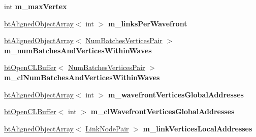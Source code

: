 \begin{DoxyCompactItemize}
int {\bfseries m\+\_\+max\+Vertex}
\item 
\mbox{\label{classbtSoftBodyLinkDataOpenCLSIMDAware_a585750270f2d52986a70bc9e9fce69bc}} 
\hyperlink{classbtAlignedObjectArray}{bt\+Aligned\+Object\+Array}$<$ int $>$ {\bfseries m\+\_\+links\+Per\+Wavefront}
\item 
\mbox{\label{classbtSoftBodyLinkDataOpenCLSIMDAware_a22df988ba5d1cb3cafa69a3d69b65605}} 
\hyperlink{classbtAlignedObjectArray}{bt\+Aligned\+Object\+Array}$<$ \hyperlink{structbtSoftBodyLinkDataOpenCLSIMDAware_1_1NumBatchesVerticesPair}{Num\+Batches\+Vertices\+Pair} $>$ {\bfseries m\+\_\+num\+Batches\+And\+Vertices\+Within\+Waves}
\item 
\mbox{\label{classbtSoftBodyLinkDataOpenCLSIMDAware_a9e28eaf45a112c30896896c409177d6d}} 
\hyperlink{classbtOpenCLBuffer}{bt\+Open\+C\+L\+Buffer}$<$ \hyperlink{structbtSoftBodyLinkDataOpenCLSIMDAware_1_1NumBatchesVerticesPair}{Num\+Batches\+Vertices\+Pair} $>$ {\bfseries m\+\_\+cl\+Num\+Batches\+And\+Vertices\+Within\+Waves}
\item 
\mbox{\label{classbtSoftBodyLinkDataOpenCLSIMDAware_abb837d480b19c6af1a42494054f70820}} 
\hyperlink{classbtAlignedObjectArray}{bt\+Aligned\+Object\+Array}$<$ int $>$ {\bfseries m\+\_\+wavefront\+Vertices\+Global\+Addresses}
\item 
\mbox{\label{classbtSoftBodyLinkDataOpenCLSIMDAware_ad03f578fcf2d01f4a15c6e7374a8eaa6}} 
\hyperlink{classbtOpenCLBuffer}{bt\+Open\+C\+L\+Buffer}$<$ int $>$ {\bfseries m\+\_\+cl\+Wavefront\+Vertices\+Global\+Addresses}
\item 
\mbox{\label{classbtSoftBodyLinkDataOpenCLSIMDAware_a5eb1278822cf10066651d3a363e18610}} 
\hyperlink{classbtAlignedObjectArray}{bt\+Aligned\+Object\+Array}$<$ \hyperlink{classbtSoftBodyLinkData_1_1LinkNodePair}{Link\+Node\+Pair} $>$ {\bfseries m\+\_\+link\+Vertices\+Local\+Addresses}
\item 
\mbox{\label{classbtSoftBodyLinkDataOpenCLSIMDAware_a5a789ddbceec13b5f9d1f00116e99bd4}} 

\end{DoxyCompactItemize}
